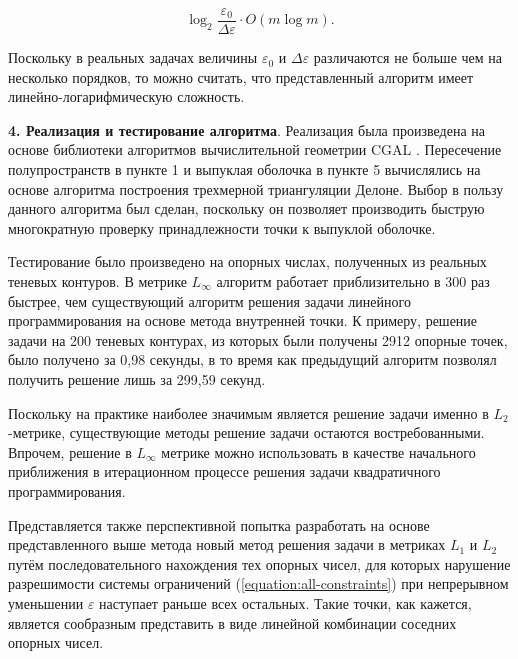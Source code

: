 \documentclass[a4paper, 10pt]{article}
\theoremstyle{definition}
\theoremstyle{plain}
\theoremstyle{plain}
\begin{document}
\begin{equation*}
 \log_{2} \frac{\varepsilon_{0}}{\Delta \varepsilon} \cdot O(m \log m).
\end{equation*}

Поскольку в реальных задачах величины $\varepsilon_{0}$ и
$\Delta \varepsilon$ различаются не больше чем на несколько порядков, то
можно считать, что представленный алгоритм имеет линейно-логарифмическую
сложность.

\textbf{4. Реализация и тестирование алгоритма}.
Реализация была произведена на основе библиотеки алгоритмов вычислительной
геометрии CGAL \cite{cgal}. Пересечение полупространств в пункте 1 и выпуклая
оболочка в пункте 5 вычислялись на основе алгоритма построения трехмерной
триангуляции Делоне. Выбор в пользу данного алгоритма был сделан, поскольку он
позволяет производить быструю многократную проверку принадлежности точки к
выпуклой оболочке.

Тестирование было произведено на опорных числах, полученных из реальных
теневых контуров. В метрике $L_{\infty}$ алгоритм работает приблизительно в 300
раз быстрее, чем существующий алгоритм решения задачи линейного программирования
на основе метода внутренней точки. К примеру, решение задачи на 200 теневых
контурах, из которых были получены 2912 опорные точек, было получено за 0,98
секунды, в то время как предыдущий алгоритм позволял получить решение лишь за
299,59 секунд.

Поскольку на практике наиболее значимым является решение задачи именно в
$L_{2}$-метрике, существующие методы решение задачи остаются востребованными.
Впрочем, решение в $L_{\infty}$ метрике можно использовать в качестве начального
приближения в итерационном процессе решения задачи квадратичного
программирования.

Представляется также перспективной попытка разработать на основе представленного
выше метода новый метод решения задачи в метриках $L_{1}$ и $L_{2}$ путём
последовательного нахождения тех опорных чисел, для которых нарушение
разрешимости системы ограничений (\ref{equation:all-constraints}) при
непрерывном уменьшении $\varepsilon$ наступает раньше всех остальных. Такие
точки, как кажется, является сообразным представить в виде линейной
комбинации соседних опорных чисел.
\end{document}
